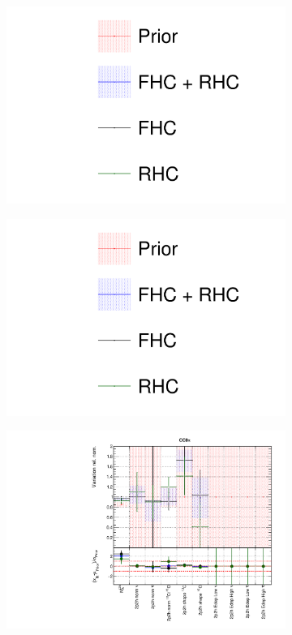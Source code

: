 \begin{figure}
\centering
\begin{subfigure}{0.3\textwidth}
  \centering
  \includegraphics[width=1.0\linewidth, trim={5mm  90mm 0mm 0mm}, clip]{figs/fhcrhcfits_leg}
\end{subfigure}
\begin{subfigure}{0.3\textwidth}
  \centering
  \includegraphics[width=1.0\linewidth, trim={5mm  0mm 0mm 95mm}, clip]{figs/fhcrhcfits_leg}
\end{subfigure}
\begin{subfigure}{0.49\textwidth}
  \centering
  \includegraphics[width=0.9\linewidth]{figs/fhcrhcfitsxsec_1}

\end{subfigure}
\end{figure}
